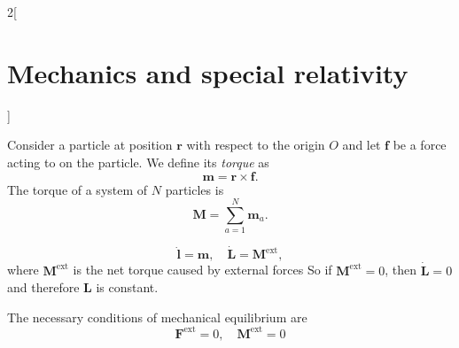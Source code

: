 \documentclass[../../../main.tex]{subfiles}
\begin{document}
\begin{multicols}{2}[\section{Mechanics and special relativity}]
\begin{concept}
\end{concept}
\begin{concept}[Torque]
Consider a particle at position $\boldsymbol{r}$ with respect to the origin $O$ and let $\boldsymbol{f}$ be a force acting to on the particle. We define its \textit{torque} as $$\boldsymbol{m}=\boldsymbol{r}\times\boldsymbol{f}.$$ The torque of a system of $N$ particles is $$\boldsymbol{M}=\sum_{a=1}^N\boldsymbol{m}_a.$$
\end{concept}
\begin{concept}
$$\dot{\boldsymbol{l}}=\boldsymbol{m},\quad\dot{\boldsymbol{L}}=\boldsymbol{M}^\text{ext},$$where $\boldsymbol{M}^\text{ext}$ is the net torque caused by external forces So if $\boldsymbol{M}^\text{ext}=0$, then $\dot{\boldsymbol{L}}=0$ and therefore $\boldsymbol{L}$ is constant.
\end{concept}
\begin{concept}
The necessary conditions of mechanical equilibrium are $$\boldsymbol{F}^\text{ext}=0,\quad\boldsymbol{M}^\text{ext}=0$$
\end{concept}

\end{multicols}
\end{document}
